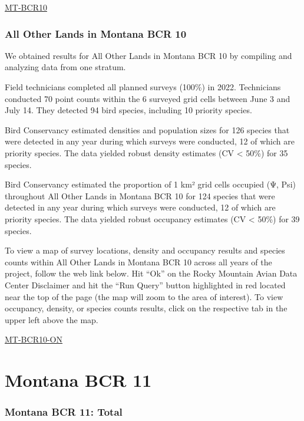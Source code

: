 \documentclass[
  letterpaper,
  DIV=11,
  numbers=noendperiod,
  oneside]{scrreprt}
\begin{document}
\href{http://www.rmbo.org/new_site/adc/QueryWindow.aspx\#N4IgzgrgDgpgTmALnAhoiBbEAuABCAWQBUBaAIQGEAlARgAYQBfIA===}{MT-BCR10}

\hypertarget{all-other-lands-in-montana-bcr-10}{%
\subsubsection{All Other Lands in Montana BCR
10}\label{all-other-lands-in-montana-bcr-10}}

We obtained results for All Other Lands in Montana BCR 10 by compiling
and analyzing data from one stratum.

Field technicians completed all planned surveys (100\%) in 2022.
Technicians conducted 70 point counts within the 6 surveyed grid cells
between June 3 and July 14. They detected 94 bird species, including 10
priority species.

Bird Conservancy estimated densities and population sizes for 126
species that were detected in any year during which surveys were
conducted, 12 of which are priority species. The data yielded robust
density estimates (CV \textless{} 50\%) for 35 species.

Bird Conservancy estimated the proportion of 1 km² grid cells occupied
(Ψ, Psi) throughout All Other Lands in Montana BCR 10 for 124 species
that were detected in any year during which surveys were conducted, 12
of which are priority species. The data yielded robust occupancy
estimates (CV \textless{} 50\%) for 39 species.

To view a map of survey locations, density and occupancy results and
species counts within All Other Lands in Montana BCR 10 across all years
of the project, follow the web link below. Hit ``Ok'' on the Rocky
Mountain Avian Data Center Disclaimer and hit the ``Run Query'' button
highlighted in red located near the top of the page (the map will zoom
to the area of interest). To view occupancy, density, or species counts
results, click on the respective tab in the upper left above the map.

\href{http://www.rmbo.org/new_site/adc/QueryWindow.aspx\#N4IgzgLgTghhCuBbEAuABCAsgFQLQCEBhAJQEYAGXAeQDl0BBAG0bSogAsBTKNAGRgB2AEzAgAvkA===}{MT-BCR10-ON}

\hypertarget{montana-bcr-11}{%
\section{Montana BCR 11}\label{montana-bcr-11}}

\hypertarget{montana-bcr-11-total}{%
\subsubsection{Montana BCR 11: Total}\label{montana-bcr-11-total}}
\end{document}
